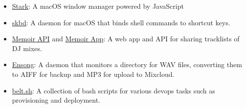 \begin{itemize}
  \item \href{https://github.com/starkwm/stark}
    {Stark}: A macOS window manager powered by JavaScript
  \item \href{https://github.com/starkwm/skbd}
    {skbd}: A daemon for macOS that binds shell commands to shortcut keys.
  \item \href{https://github.com/tombell/memoir}
    {Memoir API} and \href{https://github.com/tombell/memoir-app}{Memoir App}:
    A web app and API for sharing tracklists of DJ mixes.
  \item \href{https://github.com/tombell/ensong}{Ensong}: A daemon that monitors
    a directory for WAV files, converting them to AIFF for backup and MP3 for
    upload to Mixcloud.
  \item \href{https://github.com/belt-project/belt.sh}{belt.sh}: A collection of
    bash scripts for various devops tasks such as provisioning and deployment.
\end{itemize}
